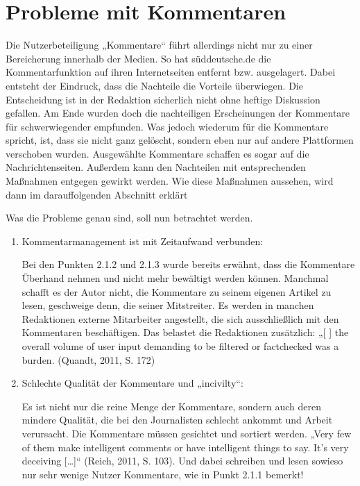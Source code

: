 \section{Probleme mit Kommentaren}

Die Nutzerbeteiligung „Kommentare“ führt allerdings nicht nur zu einer
Bereicherung innerhalb der Medien. So hat süddeutsche.de die Kommentarfunktion
auf ihren Internetseiten entfernt bzw. ausgelagert. Dabei entsteht der Eindruck,
dass die Nachteile die Vorteile überwiegen. Die Entscheidung ist in der
Redaktion sicherlich nicht ohne heftige Diskussion gefallen. Am Ende wurden doch
die nachteiligen Erscheinungen der Kommentare für schwerwiegender empfunden. Was
jedoch wiederum für die Kommentare spricht, ist, dass sie nicht ganz gelöscht,
sondern eben nur auf andere Plattformen verschoben wurden. Ausgewählte
Kommentare schaffen es sogar auf die Nachrichtenseiten. Außerdem kann den
Nachteilen mit entsprechenden Maßnahmen entgegen gewirkt werden. Wie diese
Maßnahmen aussehen, wird dann im darauffolgenden Abschnitt erklärt

Was die Probleme genau sind, soll nun betrachtet werden.

\begin{enumerate}
\item Kommentarmanagement ist mit Zeitaufwand verbunden:

Bei den Punkten 2.1.2 und 2.1.3 wurde bereits erwähnt, dass die Kommentare
Überhand nehmen und nicht mehr bewältigt werden können. Manchmal schafft es der
Autor nicht, die Kommentare zu seinem eigenen Artikel zu lesen, geschweige denn,
die seiner Mitstreiter. Es werden in manchen Redaktionen externe Mitarbeiter
angestellt, die sich ausschließlich mit den Kommentaren beschäftigen. Das
belastet die Redaktionen zusätzlich: „[ ] the overall volume of user input
demanding to be filtered or factchecked was a burden. (Quandt, 2011, S. 172)


\item Schlechte Qualität der Kommentare und „incivilty“:

Es ist nicht nur die reine Menge der Kommentare, sondern auch deren mindere
Qualität, die bei den Journalisten schlecht ankommt und Arbeit verursacht. Die
Kommentare müssen gesichtet und sortiert werden. „Very few of them make
intelligent comments or have intelligent things to say. It's very deceiving
[\ldots]“ (Reich, 2011, S. 103).  Und dabei schreiben und lesen sowieso nur sehr
wenige Nutzer Kommentare, wie in Punkt 2.1.1 bemerkt!

\end{enumerate}



